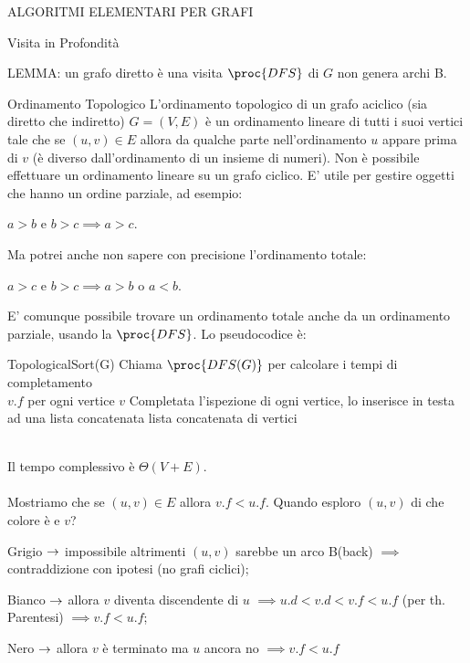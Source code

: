 \documentclass[8pt]{extarticle}
\begin{document}
\begin{formulario}
\begin{myParagraph}{ALGORITMI ELEMENTARI PER GRAFI}
\begin{subParagraph}{Visita in Profondità}
\begin{Descr}
				\begin{Descr} 
					\item[LEMMA:] un grafo diretto è  \SSE una visita $\proc{DFS}$ di $G$ non genera archi B.
				\end{Descr}
			\end{Descr}
		\end{subParagraph}
		\begin{subParagraph}{Ordinamento Topologico}
L'ordinamento topologico di un grafo aciclico (sia diretto che indiretto) $G=(V,E)$ è un ordinamento lineare di tutti i suoi vertici tale che se $(u,v)\in E$ allora da qualche parte nell'ordinamento $u$ appare prima di $v$ (è diverso dall'ordinamento di un insieme di numeri). Non è possibile effettuare un ordinamento lineare su un grafo ciclico. E' utile per gestire oggetti che hanno un ordine parziale, ad esempio:
			\begin{tcenter}
$a>b$ e $b>c \implies a>c$. 
			\end{tcenter}
Ma potrei anche non sapere con precisione l'ordinamento totale:
			\begin{tcenter}
$a>c$ e $b>c\implies a>b$ o $a<b$. 
			\end{tcenter}
E' comunque possibile trovare un ordinamento totale anche da un ordinamento parziale, usando la $\proc{DFS}$. Lo pseudocodice è:
			\begin{code}{TopologicalSort(G)}
\li Chiama $\proc{DFS(G)}$ per calcolare i tempi di completamento \\ $v.f$ per ogni vertice $v$
\li Completata l'ispezione di ogni vertice, lo inserisce in testa \\ ad una lista concatenata
\li \RETURN lista concatenata di vertici
			\end{code}
\\
Il tempo complessivo è $\Theta(V+E)$.\\
\\
Mostriamo che se $(u,v)\in E$ allora $v.f<u.f$. Quando esploro $(u,v)$ di che colore è e $v$?
			\begin{descr}{1}
				\item[Grigio] $\rightarrow$ impossibile altrimenti $(u,v)$ sarebbe un arco B(back) $\implies$ contraddizione con ipotesi (no grafi ciclici);
				\item[Bianco] $\rightarrow$ allora $v$ diventa discendente di $u$ $\implies u.d<v.d<v.f<u.f$ (per th. Parentesi) $\implies v.f<u.f$;
				\item[Nero] $\rightarrow$ allora $v$ è terminato ma $u$ ancora no $\implies v.f<u.f$

\end{descr}
\end{subParagraph}
\end{myParagraph}
\end{formulario}
\end{document}
